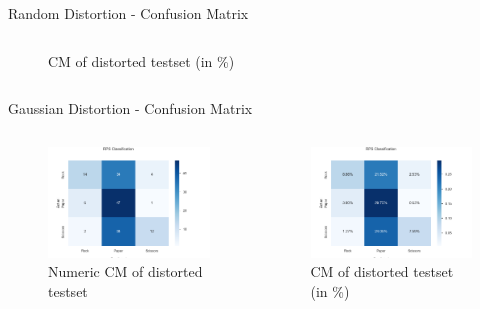 \documentclass[aspectratio=169]{beamer}
\begin{document}
{\begin{frame}{Random Distortion - Confusion Matrix}
\begin{columns}
\begin{column}{.5\textwidth}
\begin{figure}
					\caption{CM of distorted testset (in \%)}
				\end{figure}      
			\end{column} 
		\end{columns}  
	\end{frame}

	\begin{frame}{Gaussian Distortion - Confusion Matrix}
		\begin{columns}
			\begin{column}{.5\textwidth}
				\begin{figure}
					\centering
					\includegraphics[width=1\textwidth]{img/CFM_final_test_gauss_numeric.png}
					\caption{Numeric CM of distorted testset}
				\end{figure}      
			\end{column}
			\begin{column}{.5\textwidth}
				\begin{figure}
					\centering
					\includegraphics[width=\textwidth]{img/CFM_final_test_gauss_percent.png}
					\caption{CM of distorted testset (in \%)}
				\end{figure}      
			\end{column} 
		\end{columns}  
	\end{frame}

}
\end{document}
